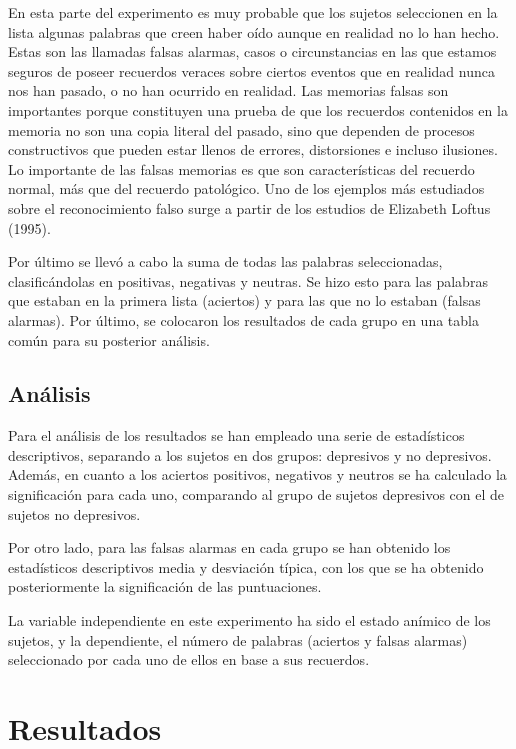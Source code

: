 \documentclass[a4paper,11pt]{article}
\begin{document}
En esta parte del experimento es muy probable que los sujetos seleccionen en la lista algunas palabras que creen haber oído aunque en realidad no lo han hecho. Estas son las llamadas falsas alarmas, casos o circunstancias en las que estamos seguros de poseer recuerdos veraces sobre ciertos eventos que en realidad nunca nos han pasado, o no han ocurrido en realidad. Las memorias falsas son importantes porque constituyen una prueba de que los recuerdos contenidos en la memoria no son una copia literal del pasado, sino que dependen de procesos constructivos que pueden estar llenos de errores, distorsiones e incluso ilusiones. Lo importante de las falsas memorias es que son características del recuerdo normal, más que del recuerdo patológico. Uno de los ejemplos más estudiados sobre el reconocimiento falso surge a partir de los estudios de Elizabeth Loftus (1995).

Por último se llevó a cabo la suma de todas las palabras seleccionadas, clasificándolas en positivas, negativas y neutras. Se hizo esto para las palabras que estaban en la primera lista (aciertos) y para las que no lo estaban (falsas alarmas). Por último, se colocaron los resultados de cada grupo en una tabla común para su posterior análisis.

\subsection{Análisis}
Para el análisis de los resultados se han empleado una serie de estadísticos descriptivos, separando a los sujetos en dos grupos: depresivos y no depresivos. Además, en cuanto a los aciertos positivos, negativos y neutros se ha calculado la significación para cada uno, comparando al grupo de sujetos depresivos con el de sujetos no depresivos.

Por otro lado, para las falsas alarmas en cada grupo se han obtenido los estadísticos descriptivos media y desviación típica, con los que se ha obtenido posteriormente la significación de las puntuaciones. 

La variable independiente en este experimento ha sido el estado anímico de los sujetos, y la dependiente, el número de palabras (aciertos y falsas alarmas) seleccionado por cada uno de ellos en base a sus recuerdos.

\section{Resultados}
\end{document}

